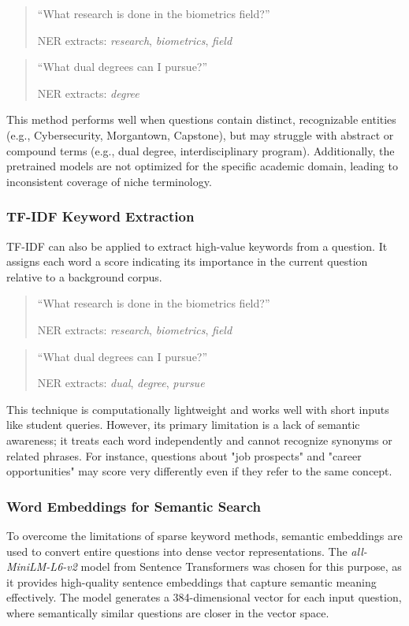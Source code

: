 \documentclass[conference]{IEEEtran}
\begin{document}
\begin{quote}
    ``What research is done in the biometrics field?''
    
    NER extracts: \textit{research}, \textit{biometrics}, \textit{field} 
\end{quote}

\begin{quote}
    ``What dual degrees can I pursue?''
    
    NER extracts: \textit{degree} 
\end{quote}

This method performs well when questions contain distinct, recognizable entities (e.g., Cybersecurity, Morgantown, Capstone), but may struggle with abstract or compound terms (e.g., dual degree, interdisciplinary program). 
Additionally, the pretrained models are not optimized for the specific academic domain, leading to inconsistent coverage of niche terminology.

\subsubsection{TF-IDF Keyword Extraction}
TF-IDF can also be applied to extract high-value keywords from a question. 
It assigns each word a score indicating its importance in the current question relative to a background corpus.

\begin{quote}
    ``What research is done in the biometrics field?''
    
    NER extracts: \textit{research}, \textit{biometrics}, \textit{field} 
\end{quote}

\begin{quote}
    ``What dual degrees can I pursue?''
    
    NER extracts: \textit{dual}, \textit{degree}, \textit{pursue}
\end{quote}
This technique is computationally lightweight and works well with short inputs like student queries. 
However, its primary limitation is a lack of semantic awareness; it treats each word independently and cannot recognize synonyms or related phrases. 
For instance, questions about "job prospects" and "career opportunities" may score very differently even if they refer to the same concept.

\subsubsection{Word Embeddings for Semantic Search} \label{sec:word_embeddings}
To overcome the limitations of sparse keyword methods, semantic embeddings are used to convert entire questions into dense vector representations.
The \textit{all-MiniLM-L6-v2} model from Sentence Transformers \cite{b15} \cite{b16} was chosen for this purpose, as it provides high-quality sentence embeddings that capture semantic meaning effectively.
The model generates a 384-dimensional vector for each input question, where semantically similar questions are closer in the vector space.
\end{document}
